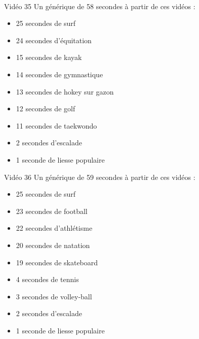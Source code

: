 \documentclass[10pt, a5paper,twoside]{article}
\begin{document}
\vfill

\clearpage
~
\vfill

\begin{card}[width = \textwidth, colback = olympicviolet, colframe = olympicviolet, bottomtitle = 2mm]{Vidéo 35}
  Un générique de 58 secondes à partir de ces vidéos :
  \vspace{-1mm}\begin{itemize}
    \item 25 secondes de surf
    \item 24 secondes d'équitation
    \item 15 secondes de kayak
    \item 14 secondes de gymnastique
    \item 13 secondes de hokey sur gazon
    \item 12 secondes de golf
    \item 11 secondes de taekwondo
    \item 2 secondes d'escalade
    \item 1 seconde de liesse populaire
  \end{itemize}
\end{card}

\vfill

\begin{card}[width = \textwidth, colback = olympicviolet, colframe = olympicviolet, bottomtitle = 2mm]{Vidéo 36}
  Un générique de 59 secondes à partir de ces vidéos :
  \vspace{-1mm}\begin{itemize}
    \item 25 secondes de surf
    \item 23 secondes de football
    \item 22 secondes d'athlétisme
    \item 20 secondes de natation
    \item 19 secondes de skateboard
    \item 4 secondes de tennis
    \item 3 secondes de volley-ball
    \item 2 secondes d'escalade
    \item 1 seconde de liesse populaire
  \end{itemize}
\end{card}

\vfill

\clearpage

\vfill
\end{document}
